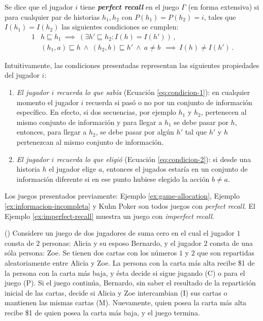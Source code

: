 \begin{definition}
\label{def:perfect-recall}
Se dice que el jugador $i$ tiene \textbf{\textit{perfect recall}} en el juego $\Gamma$ (en forma extensiva) si para cualquier par de historias $h_1, h_2$ con $P(h_1) = P(h_2) = i$, tales que $I(h_1) = I(h_2)$ las siguientes condiciones se cumplen:
\begin{alignat}{1}
& h \sqsubseteq h_1\ \implies\ (\exists h' \sqsubseteq h_2 : I(h) = I(h')) \,,
\label{eq:condicion-1}\\
& (h_1, a) \sqsubseteq h\  \land\ (h_2, b)\sqsubseteq h'\ \land\ a \neq b\ \  \implies\ I(h) \neq I(h') \,.
\label{eq:condicion-2}
\end{alignat}
\end{definition}

Intuitivamente, las condiciones presentadas representan las siguientes propiedades del jugador $i$:
\begin{enumerate}[noitemsep]
\item \textit{El jugador $i$ recuerda lo que sabía} (Ecuación \ref{eq:condicion-1}): en cualquier momento el jugador $i$ recuerda si pasó o no por un conjunto de información específico. En efecto, si dos secuencias, por ejemplo $h_1$ y $h_2$, pertenecen al mismo conjunto de información y para llegar a $h_1$ se debe pasar por $h$, entonces, para llegar a $h_2$, se debe pasar por algún $h'$ tal que $h'$ y $h$ pertenezcan al mismo conjunto de información. 

\item \textit{El jugador $i$ recuerda lo que eligió} (Ecuación \ref{eq:condicion-2}): si desde una historia $h$ el jugador elige $a$, entonces el jugados estaría  en un conjunto de información diferente si en ese punto hubiese elegido la acción $b \neq a$.
\end{enumerate}

Los juegos presentados previamente: Ejemplo \ref{ex:game-allocation}, Ejemplo \ref{ex:informacion-incompleta} y Kuhn Poker son todos juegos con \textit{perfect recall}. El Ejemplo \ref{ex:imperfect-recall} muestra un juego con \textit{imperfect recall}.

\begin{example} (\cite{bib:conceptos-basicos})
\label{ex:imperfect-recall}
Considere un juego de dos jugadores de suma cero en el cual el jugador $1$ consta de $2$ personas: Alicia y su esposo Bernardo, y el jugador $2$ consta de una sóla persona: Zoe. Se tienen dos cartas con los números $1$ y $2$ que son repartidas aleatoriamente entre Alicia y Zoe. La persona con la carta más alta recibe \$1 de la persona con la carta más baja, y ésta decide si sigue jugando (C) o para el juego (P). Si el juego continúa, Bernardo, sin saber el resultado de la repartición inicial de las cartas, decide si Alicia y Zoe intercambian (I) sus cartas o mantienen las mismas cartas (M). Nuevamente, quien posea la carta más alta recibe \$1 de quien posea la carta más baja, y el juego termina.
\end{example}

